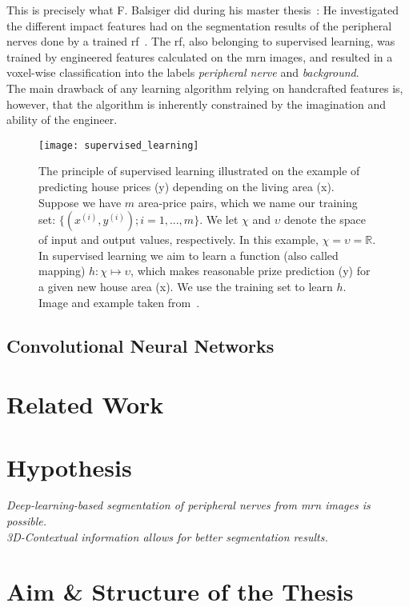 This is precisely what F. Balsiger did during his master thesis~\cite{Balsiger2016DevelopmentApproaches}: He investigated the different impact features had on the segmentation results of the peripheral nerves done by a trained \gls{rf}~\cite{Breiman2001RandomForests}. The \gls{rf}, also belonging to supervised learning, was trained by engineered features calculated on the \gls{mrn} images, and resulted in a voxel-wise classification into the labels \textit{peripheral nerve} and \textit{background}. \\
The main drawback of any learning algorithm relying on handcrafted features is, however, that the algorithm is inherently constrained by the imagination and ability of the engineer.

\begin{figure}[htbp]
    \centering
	\texttt{[image: supervised\_learning]}
    \caption[Supervised Learning]{The principle of supervised learning illustrated on the example of predicting house prices (y) depending on the living area (x). Suppose we have $m$ area-price pairs, which we name our training set: $\{(x^{(i)}, y^{(i)}); i = 1,...,m\}$. We let $\chi$ and $\upsilon$ denote the space of input and output values, respectively. In this example, $\chi = \upsilon = \mathbb{R}$. In supervised learning we aim to learn a function (also called mapping) $h : \chi \mapsto \upsilon$, which makes reasonable prize prediction (y) for a given new house area (x). We use the training set to learn $h$. Image and example taken from~\cite{Ng2012CS229Notes}.}
    \label{fig:dl_supervised}
\end{figure}

\subsection{Convolutional Neural Networks}



\section{Related Work}
\section{Hypothesis}

\textit{Deep-learning-based segmentation of peripheral nerves from \gls{mrn} images is possible.} \\
\textit{3D-Contextual information allows for better segmentation results.}

\section{Aim \& Structure of the Thesis}

\endinput